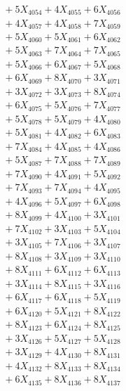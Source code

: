 \documentclass[a4paper,10pt]{article}
\begin{document}
{\begin{align}
&\;  + 5 X_{4054} + 4 X_{4055} + 6 X_{4056} \\[0.3ex]
&\;  + 4 X_{4057} + 4 X_{4058} + 7 X_{4059} \\[0.5ex]\allowbreak
&\;  + 5 X_{4060} + 5 X_{4061} + 6 X_{4062} \\[0.3ex]
&\;  + 5 X_{4063} + 7 X_{4064} + 7 X_{4065} \\[0.3ex]
&\;  + 5 X_{4066} + 6 X_{4067} + 5 X_{4068} \\[0.3ex]
&\;  + 6 X_{4069} + 8 X_{4070} + 3 X_{4071} \\[0.3ex]
&\;  + 3 X_{4072} + 3 X_{4073} + 8 X_{4074} \\[0.3ex]
&\;  + 6 X_{4075} + 5 X_{4076} + 7 X_{4077} \\[0.3ex]
&\;  + 5 X_{4078} + 5 X_{4079} + 4 X_{4080} \\[0.3ex]
&\;  + 5 X_{4081} + 4 X_{4082} + 6 X_{4083} \\[0.3ex]
&\;  + 7 X_{4084} + 4 X_{4085} + 4 X_{4086} \\[0.3ex]
&\;  + 5 X_{4087} + 7 X_{4088} + 7 X_{4089} \\[0.5ex]\allowbreak
&\;  + 7 X_{4090} + 4 X_{4091} + 5 X_{4092} \\[0.3ex]
&\;  + 7 X_{4093} + 7 X_{4094} + 4 X_{4095} \\[0.3ex]
&\;  + 4 X_{4096} + 5 X_{4097} + 6 X_{4098} \\[0.3ex]
&\;  + 8 X_{4099} + 4 X_{4100} + 3 X_{4101} \\[0.3ex]
&\;  + 7 X_{4102} + 3 X_{4103} + 5 X_{4104} \\[0.3ex]
&\;  + 3 X_{4105} + 7 X_{4106} + 3 X_{4107} \\[0.3ex]
&\;  + 8 X_{4108} + 3 X_{4109} + 3 X_{4110} \\[0.3ex]
&\;  + 8 X_{4111} + 6 X_{4112} + 6 X_{4113} \\[0.3ex]
&\;  + 3 X_{4114} + 8 X_{4115} + 3 X_{4116} \\[0.3ex]
&\;  + 6 X_{4117} + 6 X_{4118} + 5 X_{4119} \\[0.5ex]\allowbreak
&\;  + 6 X_{4120} + 5 X_{4121} + 8 X_{4122} \\[0.3ex]
&\;  + 8 X_{4123} + 6 X_{4124} + 8 X_{4125} \\[0.3ex]
&\;  + 3 X_{4126} + 5 X_{4127} + 5 X_{4128} \\[0.3ex]
&\;  + 3 X_{4129} + 4 X_{4130} + 8 X_{4131} \\[0.3ex]
&\;  + 4 X_{4132} + 8 X_{4133} + 8 X_{4134} \\[0.3ex]
&\;  + 6 X_{4135} + 8 X_{4136} + 8 X_{4137} \\[0.3ex]

\end{align}}
\end{document}
